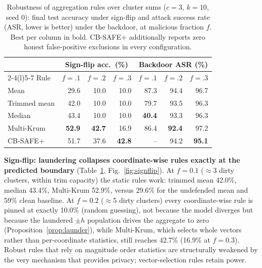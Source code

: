 \documentclass[conference]{IEEEtran}
\begin{document}
\begin{table}[t]
\caption{Robustness of aggregation rules over cluster sums ($c{=}3$, $k{=}10$,
seed 0): final test accuracy under sign-flip and attack success rate (ASR, lower is
better) under the backdoor, at malicious fraction $f$. Best per column in bold.
CB-SAFE+ additionally reports zero honest false-positive exclusions in every
configuration.}
\label{tab:robust}
\centering
\footnotesize
\setlength{\tabcolsep}{3.2pt}
\begin{tabular}{@{}lrrrrrr@{}}
\toprule
& \multicolumn{3}{c}{Sign-flip acc.\ (\%)} & \multicolumn{3}{c}{Backdoor ASR (\%)}\\
\cmidrule(lr){2-4}\cmidrule(l){5-7}
Rule & $f{=}.1$ & $f{=}.2$ & $f{=}.3$ & $f{=}.1$ & $f{=}.2$ & $f{=}.3$\\
\midrule
Mean          & 29.6 & 10.0 & 10.0 & 87.3 & 94.4 & 96.7\\
Trimmed mean  & 42.0 & 10.0 & 10.0 & 79.7 & 93.5 & 96.3\\
Median        & 43.4 & 10.0 & 10.0 & \textbf{40.4} & 93.3 & 96.3\\
Multi-Krum    & \textbf{52.9} & \textbf{42.7} & 16.9 & 86.4 & \textbf{92.4} & 97.2\\
CB-SAFE+      & 51.7 & 37.6 & \textbf{42.8} & -- & 94.2 & \textbf{95.1}\\
\bottomrule
\end{tabular}
\end{table}

\textbf{Sign-flip: laundering collapses coordinate-wise rules exactly at the
predicted boundary} (Table~\ref{tab:robust}, Fig.~\ref{fig:signflip}). At $f{=}0.1$ ($\approx$3 dirty
clusters, within trim capacity) the static rules work: trimmed mean 42.0\%, median
43.4\%, Multi-Krum 52.9\%, versus 29.6\% for the undefended mean and 59\% clean
baseline. At $f{=}0.2$ ($\approx$5 dirty clusters) every coordinate-wise rule is
pinned at exactly 10.0\% (random guessing), not because the model diverges but
because the laundered $\pm h$ population drives the aggregate to zero
(Proposition~\ref{prop:launder}), while Multi-Krum, which selects whole vectors
rather than per-coordinate statistics, still reaches 42.7\% (16.9\% at $f{=}0.3$).
Robust rules that rely on magnitude order statistics are structurally weakened by
the very mechanism that provides privacy; vector-selection rules retain power.
\end{document}
